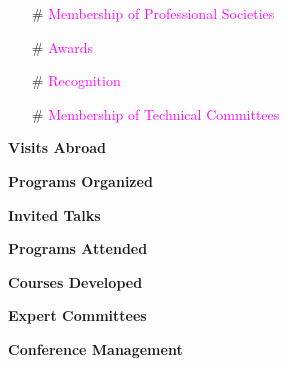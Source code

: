 \documentclass [a4paper,12pt]{article}
\begin{document}
\begin{itemize}
	\item[\#] \textcolor{magenta}{Membership of Professional Societies}
  
	\item[\#] \textcolor{magenta}{Awards}

	\item[\#] \textcolor{magenta}{Recognition}

	\item[\#] \textcolor{magenta}{Membership of Technical  Committees}


\end{itemize}

\begin{flushleft}
\textbf{\textcolor[rgb]{0.00,0.00,1.00}{Visits Abroad}} 
\end{flushleft}


\begin{flushleft}
\textbf{\textcolor[rgb]{0.00,0.00,1.00}{Programs Organized}} 
\end{flushleft}



\begin{flushleft}
\textbf{\textcolor[rgb]{0.00,0.00,1.00}{Invited Talks}} 
\end{flushleft}



\begin{flushleft}
\textbf{\textcolor[rgb]{0.00,0.00,1.00}{Programs Attended}}
\end{flushleft}



\begin{flushleft}
\textbf{\textcolor[rgb]{0.00,0.00,1.00}{Courses Developed}}
\end{flushleft}



\begin{flushleft}
\textbf{\textcolor[rgb]{0.00,0.00,1.00}{Expert Committees}} 
\end{flushleft}



\begin{flushleft}
\textbf{\textcolor[rgb]{0.00,0.00,1.00}{Conference Management}}
\end{flushleft}


\end{document}
